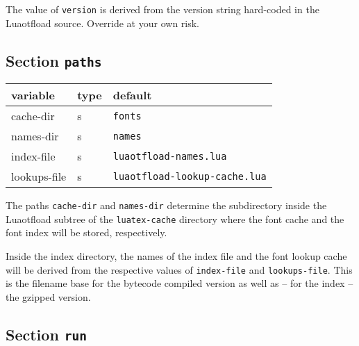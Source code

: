 \documentclass[a4paper]{article}
\newlength{\DUtablewidth} %
\begin{document}
The value of \texttt{version} is derived from the version string hard-coded
in the Luaotfload source. Override at your own risk.


\subsection{Section \texttt{paths}%
  \label{section-paths}%
}

\setlength{\DUtablewidth}{\linewidth}
\begin{longtable*}[c]{|p{0.226\DUtablewidth}|p{0.110\DUtablewidth}|p{0.435\DUtablewidth}|}
\hline

variable
 & 
type
 & 
default
 \\
\hline

cache-dir
 & 
s
 & 
\texttt{\textquotedbl{}fonts\textquotedbl{}}
 \\
\hline

names-dir
 & 
s
 & 
\texttt{\textquotedbl{}names\textquotedbl{}}
 \\
\hline

index-file
 & 
s
 & 
\texttt{\textquotedbl{}luaotfload-names.lua\textquotedbl{}}
 \\
\hline

lookups-file
 & 
s
 & 
\texttt{\textquotedbl{}luaotfload-lookup-cache.lua\textquotedbl{}}
 \\
\hline
\end{longtable*}

The paths \texttt{cache-dir} and \texttt{names-dir} determine the subdirectory
inside the Luaotfload subtree of the \texttt{luatex-cache} directory where
the font cache and the font index will be stored, respectively.

Inside the index directory, the names of the index file and the font
lookup cache will be derived from the respective values of
\texttt{index-file} and \texttt{lookups-file}. This is the filename base for the
bytecode compiled version as well as -- for the index -- the gzipped
version.


\subsection{Section \texttt{run}%
  \label{section-run}%
}
\end{document}
